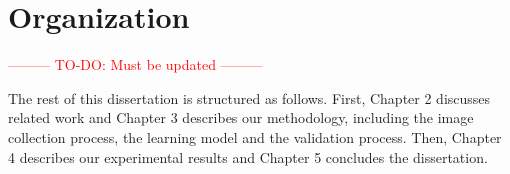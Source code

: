 \section{Organization}

\textcolor{red}{--------- TO-DO: Must be updated ---------}

The rest of this dissertation is structured as follows. First, Chapter 2 discusses related work and Chapter 3 describes our methodology, including the image collection process, the learning model and the validation process. Then, Chapter 4 describes our experimental results and Chapter 5 concludes the dissertation.